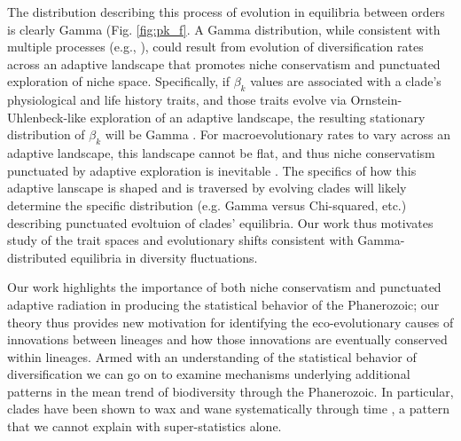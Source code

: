 \documentclass[12pt]{article}
\let\citep=\cite
\begin{document}
The distribution describing this process of evolution in equilibria
between orders is clearly Gamma (Fig. \ref{fig:pk_f}.  A Gamma
distribution, while consistent with multiple processes (e.g.,
\citep{cir1985}), could result from evolution of diversification rates
across an adaptive landscape that promotes niche conservatism and
punctuated exploration of niche space.  Specifically, if $\beta_k$
values are associated with a clade's physiological and life history
traits, and those traits evolve via Ornstein-Uhlenbeck-like
exploration of an adaptive landscape, the resulting stationary
distribution of $\beta_k$ will be Gamma \citep{cir1985, butler2004}.
For macroevolutionary rates to vary across an adaptive landscape, this
landscape cannot be flat, and thus niche conservatism punctuated by
adaptive exploration is inevitable \citep{newman1985adaptive}. The
specifics of how this adaptive lanscape is shaped and is traversed by
evolving clades will likely determine the specific distribution
(e.g. Gamma versus Chi-squared, etc.) describing punctuated evoltuion
of clades' equilibria.  Our work thus motivates study of the trait
spaces and evolutionary shifts consistent with Gamma-distributed
equilibria in diversity fluctuations.

Our work highlights the importance of both niche conservatism and
punctuated adaptive radiation in producing the statistical behavior of
the Phanerozoic; our theory thus provides new motivation for
identifying the eco-evolutionary causes of innovations between
lineages and how those innovations are eventually conserved within
lineages. Armed with an understanding of the statistical behavior of
diversification we can go on to examine mechanisms underlying
additional patterns in the mean trend of biodiversity through the
Phanerozoic. In particular, clades have been shown to wax and wane
systematically through time \citep{liow2007,
  quental2013}, a pattern that we cannot explain with super-statistics
alone.
\end{document}
